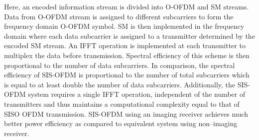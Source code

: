 Here, an encoded information stream is divided into O-OFDM and SM streams. Data from O-OFDM stream is assigned to different subcarriers to form the frequency domain O-OFDM symbol. SM is then implemented in the frequency domain where each data subcarrier is assigned to a transmitter determined by the encoded SM stream. An IFFT operation is implemented at each transmitter to multiplex the data before transmission. Spectral efficiency of this scheme is then proportional to the number of data subcarriers. In comparison, the spectral efficiency of SIS-OFDM is proportional to the number of total subcarriers which is equal to at least double the number of data subcarriers. Additionally, the SIS-OFDM system requires a single IFFT operation, independent of the number of transmitters and thus maintains a computational complexity equal to that of SISO OFDM transmission. SIS-OFDM using an imaging receiver achieves much better power efficiency as compared to equivalent system using non--imaging receiver.

